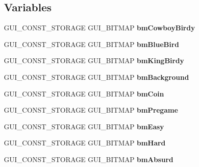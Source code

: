 \subsection*{Variables}
\begin{DoxyCompactItemize}
\item 
\mbox{\label{group___flappy___bird_ga29850cd5c5a0512f53a5f83c1ba46bd1}} 
G\+U\+I\+\_\+\+C\+O\+N\+S\+T\+\_\+\+S\+T\+O\+R\+A\+GE G\+U\+I\+\_\+\+B\+I\+T\+M\+AP {\bfseries bm\+Cowboy\+Birdy}
\item 
\mbox{\label{group___flappy___bird_gae9f981a6948159afdef83258b14ab699}} 
G\+U\+I\+\_\+\+C\+O\+N\+S\+T\+\_\+\+S\+T\+O\+R\+A\+GE G\+U\+I\+\_\+\+B\+I\+T\+M\+AP {\bfseries bm\+Blue\+Bird}
\item 
G\+U\+I\+\_\+\+C\+O\+N\+S\+T\+\_\+\+S\+T\+O\+R\+A\+GE G\+U\+I\+\_\+\+B\+I\+T\+M\+AP {\bfseries bm\+King\+Birdy}
\item 
\mbox{\label{group___flappy___bird_gad9178ef06d3cf78c3ab64a11cc27c0e4}} 
G\+U\+I\+\_\+\+C\+O\+N\+S\+T\+\_\+\+S\+T\+O\+R\+A\+GE G\+U\+I\+\_\+\+B\+I\+T\+M\+AP {\bfseries bm\+Background}
\item 
\mbox{\label{group___flappy___bird_gaf9301686710e62723a7a622d9cd355eb}} 
G\+U\+I\+\_\+\+C\+O\+N\+S\+T\+\_\+\+S\+T\+O\+R\+A\+GE G\+U\+I\+\_\+\+B\+I\+T\+M\+AP {\bfseries bm\+Coin}
\item 
G\+U\+I\+\_\+\+C\+O\+N\+S\+T\+\_\+\+S\+T\+O\+R\+A\+GE G\+U\+I\+\_\+\+B\+I\+T\+M\+AP {\bfseries bm\+Pregame}
\item 
\mbox{\label{group___flappy___bird_gad0a18046e4cf176ac2ed4837a8fce282}} 
G\+U\+I\+\_\+\+C\+O\+N\+S\+T\+\_\+\+S\+T\+O\+R\+A\+GE G\+U\+I\+\_\+\+B\+I\+T\+M\+AP {\bfseries bm\+Easy}
\item 
G\+U\+I\+\_\+\+C\+O\+N\+S\+T\+\_\+\+S\+T\+O\+R\+A\+GE G\+U\+I\+\_\+\+B\+I\+T\+M\+AP {\bfseries bm\+Hard}
\item 
\mbox{\label{group___flappy___bird_ga2db12ef701fde80baf122d8af915fdc7}} 
G\+U\+I\+\_\+\+C\+O\+N\+S\+T\+\_\+\+S\+T\+O\+R\+A\+GE G\+U\+I\+\_\+\+B\+I\+T\+M\+AP {\bfseries bm\+Absurd}
\item 
\mbox{\label{group___flappy___bird_gadd6a3b2bdca4ffe584dc53cefe4225ad}} 

\end{DoxyCompactItemize}
